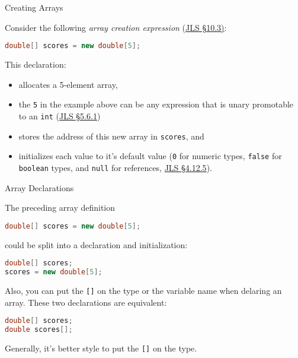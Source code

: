 \documentclass{beamer}
\begin{document}
\begin{frame}[fragile]{Creating Arrays}


Consider the following {\it array creation expression} (\href{http://docs.oracle.com/javase/specs/jls/se8/html/jls-10.html#jls-10.3}{JLS \S 10.3)}:
\begin{lstlisting}[language=Java]
double[] scores = new double[5];
\end{lstlisting}
This declaration:
\begin{itemize}
\item allocates a 5-element array,
\item the {\tt 5} in the example above can be any expression that is unary promotable to an {\tt int} (\href{http://docs.oracle.com/javase/specs/jls/se8/html/jls-5.html#jls-5.6.1}{JLS \S 5.6.1})
\item stores the address of this new array in {\tt scores}, and
\item initializes each value to it's default value ({\tt 0} for numeric types, {\tt false} for {\tt boolean} types, and {\tt null} for references, \href{http://docs.oracle.com/javase/specs/jls/se8/html/jls-4.html#jls-4.12.5}{JLS \S 4.12.5}).
\end{itemize}


\end{frame}



\begin{frame}[fragile]{Array Declarations}


The preceding array definition
\begin{lstlisting}[language=Java]
double[] scores = new double[5];
\end{lstlisting}
could be split into a declaration and initialization:
\begin{lstlisting}[language=Java]
double[] scores;
scores = new double[5];
\end{lstlisting}
Also, you can put the {\tt []} on the type or the variable name when delaring an array.  These two declarations are equivalent:
\begin{lstlisting}[language=Java]
double[] scores;
double scores[];
\end{lstlisting}
Generally, it's better style to put the {\tt []} on the type.


\end{frame}
\end{document}

